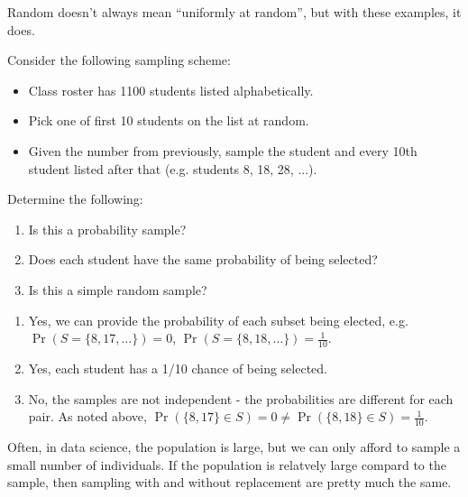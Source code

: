 \begin{notebox}[]
Random doesn't always mean ``uniformly at random'', but with these examples, it does.
\end{notebox}
\begin{example}[]{Consider the following sampling scheme:
\begin{itemize}
\item Class roster has 1100 students listed alphabetically.
\item Pick one of first 10 students on the list at random.
\item Given the number from previously, sample the student and every 10th student listed after that (e.g. students 8, 18, 28, ...).
\end{itemize}
Determine the following:
\begin{enumerate}
\item Is this a probability sample?
\item Does each student have the same probability of being selected?
\item Is this a simple random sample?
\end{enumerate}
\tcbline
\begin{enumerate}
\item Yes, we can provide the probability of each subset being elected, e.g. $\Pr(S=\{8, 17, \ldots\}) = 0$, $\Pr(S=\{8, 18, \ldots\}) = \frac{1}{10}$.
\item Yes, each student has a 1/10 chance of being selected.
\item No, the samples are not independent - the probabilities are different for each pair. As noted above, $\Pr(\{8, 17\} \in S) = 0 \neq \Pr(\{8, 18\} \in S) = \frac{1}{10}$.
\end{enumerate}
}
\end{example}
Often, in data science, the population is large, but we can only afford to sample a small number of individuals. If the population is relatvely large compard to the sample, then sampling with and without replacement are pretty much the same.
